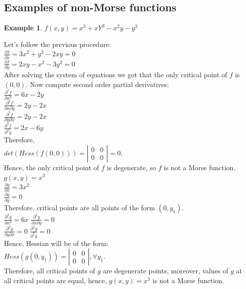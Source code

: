 \documentclass[]{article}
\newtheorem{example}{Example}
\begin{document}
\subsection{Examples of non-Morse functions} 
\begin{example}
$f(x,y)=x^3+xY^2-x^2y-y^3$
\end{example}
Let's follow the previous procedure: \\
$\frac{\partial f}{\partial x}=3x^2+y^2-2xy=0$\\
$\frac{\partial f}{\partial y}=2xy-x^2-3y^2=0$\\
After solving the system of equations we got that the only critical point of $f$ is $(0,0)$. Now compute second order partial derivatives:\\
$\frac{\partial^2 f}{\partial x^2}=6x-2y$\\
$\frac{\partial^2 f}{\partial x \partial y}=2y-2x$\\
$\frac{\partial^2 f}{\partial y \partial x}=2y-2x$\\
$\frac{\partial^2 f}{\partial^2 y}=2x-6y$\\
Therefore, \\
$det(Hess(f(0,0)))=\left| \begin{array}{cc} 0 & 0 \\ 0 & 0 \end{array} \right|=0$.\\
Hence, the only critical point of $f$ is degenerate, so $f$ is not a Morse function. \\
$g(x,y)=x^3$\\
$\frac{\partial g}{\partial x}=3x^2$\\
$\frac{\partial g}{\partial y}=0$\\
Therefore, critical points are all points of the form $(0, y_1)$.\\
$\frac{\partial^2 g}{\partial x^2}=6x$
$\frac{\partial^2 g}{\partial x \partial y}=0$\\
$\frac{\partial^2 g}{\partial y \partial x}=0$
$\frac{\partial^2 g}{\partial^2 y}=0$\\
Hence, Hessian will be of the form: \\
$Hess(g(0,y_1))=\left| \begin{array}{cc} 0 & 0 \\ 0 & 0 \end{array} \right|,  \forall y_1$. \\
Therefore, all critical points of $g$ are degenerate points, moreover, values of $g$ at all critical points are equal, hence, $g(x,y)=x^3$ is not a Morse function. 
\newpage
\end{document}
